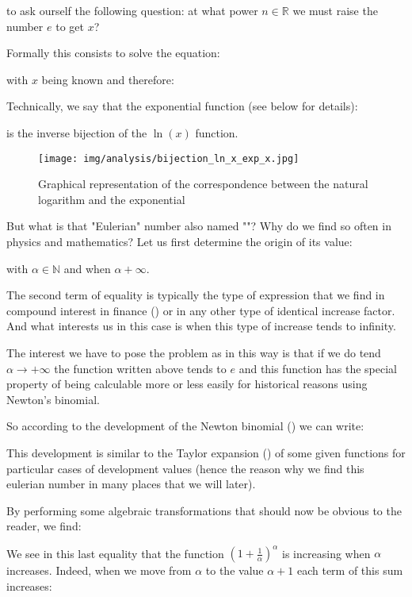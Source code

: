 	to ask ourself the following question: at what power $n\in \mathbb{R}$ we must raise the number $e$ to get $x$?
	
	Formally this consists to solve the equation:
	
	with $x$ being known and therefore:
	
	Technically, we say that the exponential function (see below for details):
	
	is the inverse bijection of the $\ln (x)$ function.
	\begin{figure}[H]
		\centering
		\texttt{[image: img/analysis/bijection\_ln\_x\_exp\_x.jpg]}
		\caption{Graphical representation of the correspondence between the natural logarithm and the exponential}
	\end{figure}
	But what is that "Eulerian" number also named ""? Why do we find so often in physics and mathematics? Let us first determine the origin of its value:
	
	with $\alpha \in \mathbb{N}$ and when $\alpha +\infty$.
	\begin{tcolorbox}[title=Remark,colframe=black,arc=10pt]
	The second term of equality is typically the type of expression that we find in compound interest in finance () or in any other type of identical increase factor. And what interests us in this case is when this type of increase tends to infinity.
	\end{tcolorbox}
	The interest we have to pose the problem as in this way is that if we do tend $\alpha \rightarrow +\infty$ the function written above tends to $e$ and this function has the special property of being calculable more or less easily for historical reasons using Newton's binomial.
	
	So according to the development of the Newton binomial () we can write:
	
	This development is similar to the Taylor expansion () of some given functions for particular cases of development values (hence the reason why we find this eulerian number in many places that we will later).
	
	By performing some algebraic transformations that should now be obvious to the reader, we find:
	
	We see in this last equality that the function $\left(1+\frac{1}{\alpha}\right)^\alpha$ is increasing when $\alpha$ increases. Indeed, when we move from $\alpha$ to the value $\alpha+1$ each term of this sum increases:
	
